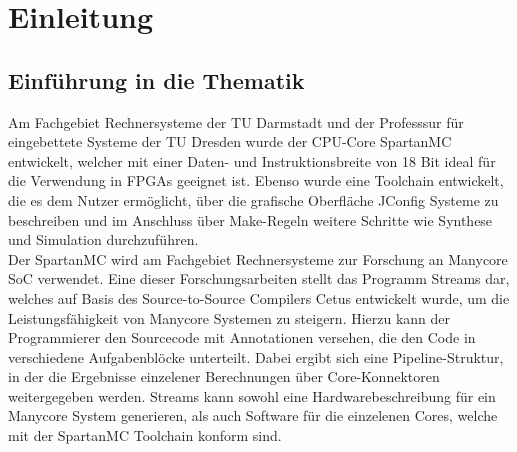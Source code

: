 \chapter{Einleitung}
\section{Einführung in die Thematik}
Am Fachgebiet Rechnersysteme der TU Darmstadt und der Professsur für eingebettete Systeme der TU Dresden wurde der CPU-Core
SpartanMC entwickelt, welcher mit einer Daten- und Instruktionsbreite von 18 Bit ideal für die Verwendung in FPGAs geeignet ist.
Ebenso wurde eine Toolchain entwickelt, die es dem Nutzer ermöglicht, über die grafische Oberfläche JConfig Systeme zu beschreiben und
im Anschluss über Make-Regeln weitere Schritte wie Synthese und Simulation durchzuführen. \cite{The_SpartanMC_Project}\\
Der SpartanMC wird am Fachgebiet Rechnersysteme zur Forschung an Manycore SoC verwendet. Eine dieser Forschungsarbeiten stellt das Programm \textmu\/Streams dar,
welches auf Basis des Source-to-Source Compilers Cetus \cite{CETUS} entwickelt wurde, um die Leistungsfähigkeit von Manycore Systemen zu steigern. 
Hierzu kann der Programmierer den Sourcecode mit Annotationen versehen, die den Code in verschiedene Aufgabenblöcke unterteilt. Dabei ergibt sich
eine Pipeline-Struktur, in der die Ergebnisse einzelener Berechnungen über Core-Konnektoren weitergegeben werden.
\textmu\/Streams kann sowohl eine Hardwarebeschreibung für ein Manycore System generieren, als auch Software für die einzelenen Cores, 
welche mit der SpartanMC Toolchain konform sind. \cite{WeberThesis}\\
